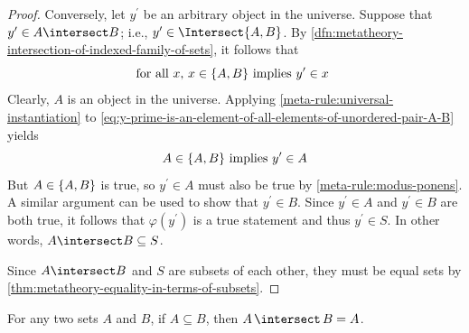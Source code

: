 \begin{proof}
    \vspace{0.3cm}
    \noindent
    Conversely, let \( y^{\prime} \) be an arbitrary object in the universe.
    Suppose that \( y^{\prime} \in A \intersect B \); i.e., \( y^{\prime} \in \Intersect \mleft\{ A, B \mright\} \).
    By \cref{dfn:metatheory-intersection-of-indexed-family-of-sets}, it follows that
    \begin{equation}
        \label{eq:y-prime-is-an-element-of-all-elements-of-unordered-pair-A-B}
        \text{for all \( x \), \( x \in \mleft\{ A, B \mright\} \) implies \( y^{\prime} \in x \) }
    \end{equation}
    Clearly, \( A \) is an object in the universe.
    Applying \cref{meta-rule:universal-instantiation} to \eqref{eq:y-prime-is-an-element-of-all-elements-of-unordered-pair-A-B} yields
    \begin{equation*}
        A \in \mleft\{ A, B \mright\} \ \text{implies} \ y^{\prime} \in A
    \end{equation*}
    But \( A \in \mleft\{ A, B \mright\} \) is true, so \( y^{\prime} \in A \) must also be true by \cref{meta-rule:modus-ponens}.
    A similar argument can be used to show that \( y^{\prime} \in B \).
    Since \( y^{\prime} \in A \) and \( y^{\prime} \in B \) are both true, it follows that \( \varphi(y^{\prime}) \) is a true statement
    and thus \( y^{\prime} \in S \).
    In other words, \( A \intersect B \subseteq S \).

    \vspace{0.3cm}
    \noindent
    Since \( A \intersect B \) and \( S \) are subsets of each other, they must be equal sets by \cref{thm:metatheory-equality-in-terms-of-subsets}.
\end{proof}

\begin{thm}
     \label{thm:metatheory-the-intersection-between-a-set-and-its-subset-equals-the-subset}
    For any two sets \( A \) and \( B \), if \( A \subseteq B \), then \( A \,{\intersect}\, B = A \).
\end{thm}

